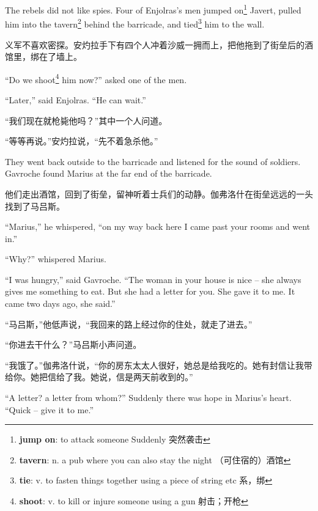 \documentclass[fontset=ubuntu, zihao=5]{ctexart}
\begin{document}
\begin{paracol}{2}
\switchcolumn*

The rebels did not like spies. Four of Enjolras's men jumped
on\footnote{\textbf{jump on}: to attack someone Suddenly 突然袭击} Javert,
pulled him into the tavern\footnote{\textbf{tavern}: n. a pub where you can
  also stay the night （可住宿的）酒馆} behind the barricade, and
tied\footnote{\textbf{tie}: v. to fasten things together using a piece of
  string etc 系，绑} him to the wall.

\switchcolumn

义军不喜欢密探。安灼拉手下有四个人冲着沙威一拥而上，把他拖到了街垒后的酒馆里，绑在了墙上。

\switchcolumn*

``Do we shoot\footnote{\textbf{shoot}: v. to kill or injure someone using a
  gun 射击；开枪} him now?'' asked one of the men.

``Later,'' said Enjolras. ``He can wait.''

\switchcolumn

“我们现在就枪毙他吗？”其中一个人问道。

“等等再说。”安灼拉说，“先不着急杀他。”

\switchcolumn*

They went back outside to the barricade and listened for the sound of soldiers. Gavroche found Marius at the far end of the barricade.

\switchcolumn

他们走出酒馆，回到了街垒，留神听着士兵们的动静。伽弗洛什在街垒远远的一头找到了马吕斯。

\switchcolumn*

``Marius,'' he whispered, ``on my way back here I came past your rooms and went in.''

``Why?'' whispered Marius.

``I was hungry,'' said Gavroche. ``The woman in your house is nice – she always gives me something to eat. But she had a letter for you. She gave it to me. It came two days ago, she said.''


\switchcolumn

“马吕斯，”他低声说，“我回来的路上经过你的住处，就走了进去。”

“你进去干什么？”马吕斯小声问道。

“我饿了。”伽弗洛什说，“你的房东太太人很好，她总是给我吃的。她有封信让我带给你。她把信给了我。她说，信是两天前收到的。”

\switchcolumn*

``A letter? a letter from whom?'' Suddenly there was hope in Marius's heart. ``Quick – give it to me.''



\end{paracol}
\end{document}
